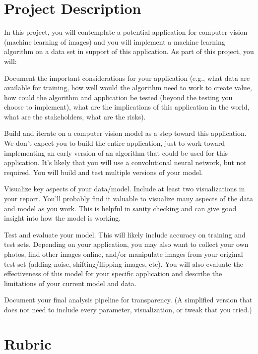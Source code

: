 \documentclass{tufte-handout}
\begin{document}
\section*{Project Description}
In this project, you will contemplate a potential application for computer vision (machine learning of images) and you will implement a machine learning algorithm on a data set in support of this application. As part of this project, you will:
\bi[leftmargin=.5in]
\item Document the important considerations for your application (e.g., what data are available for training, how well would the algorithm need to work to create value, how could the algorithm and application be tested (beyond the testing you choose to implement), what are the implications of this application in the world, what are the stakeholders, what are the risks). 
\item Build and iterate on a computer vision model as a step toward this application. We don’t expect you to build the entire application, just to work toward implementing an early version of an algorithm that could be used for this application. It’s likely that you will use a convolutional neural network, but not required. You will build and test multiple versions of your model.
\item Visualize key aspects of your data/model. Include at least two visualizations in your report. You’ll probably find it valuable to visualize many aspects of the data and model as you work. This is helpful in sanity checking and can give good insight into how the model is working.
\item Test and evaluate your model. This will likely include accuracy on training and test sets. Depending on your application, you may also want to collect your own photos, find other images online, and/or manipulate images from your original test set (adding noise, shifting/flipping images, etc). You will also evaluate the effectiveness of this model for your specific application and describe the limitations of your current model and data.
\item Document your final analysis pipeline for transparency. (A simplified version that does not need to include every parameter, visualization, or tweak that you tried.)
\ei

\section*{Rubric}
\end{document}
